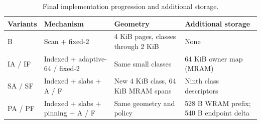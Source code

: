 \begin{table}[t]
\caption{Final implementation progression and additional storage.}\label{tab:variants}
\centering\small
\begin{tabular}{@{}p{}p{}p{}p{}@{}}\toprule
Variants & Mechanism & Geometry & Additional storage \\ \midrule
B & Scan + fixed-2 & 4 KiB pages, classes through 2 KiB & None \\
IA / IF & Indexed + adaptive-64 / fixed-2 & Same small classes & 64 KiB owner map (MRAM) \\
SA / SF & Indexed + slabs + A / F & New 4 KiB class, 64 KiB MRAM spans & Ninth class descriptors \\
PA / PF & Indexed + slabs + pinning + A / F & Same geometry and policy & 528 B WRAM prefix; 540 B endpoint delta \\
\bottomrule\end{tabular}
\end{table}
